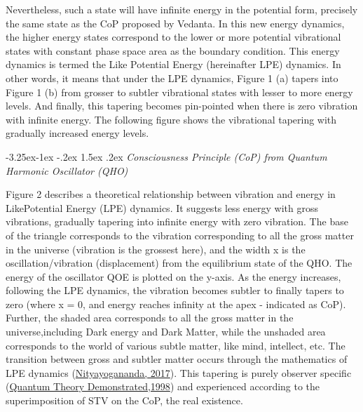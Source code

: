 \documentclass[twoside, 13pt]{article}
\makeatletter
\renewcommand\subsubsection{\@startsection{subsubsection}{3}{\z@}%
                                     {-3.25ex\@plus -1ex \@minus -.2ex}%
                                     {1.5ex \@plus .2ex}%
                                     {\normalfont\large\bfseries}}
\makeatother
\begin{document}
{{Nevertheless, such a state will have infinite energy in the potential form, precisely the same state as the CoP proposed by Vedanta. In this new energy dynamics, the higher energy states correspond to the lower or more potential vibrational states with constant phase space area as the boundary condition. This energy dynamics is termed the Like Potential Energy (hereinafter LPE) dynamics. In other words, it means that under the LPE dynamics, Figure 1 (a) tapers into Figure 1 (b) from grosser to subtler vibrational states with lesser to more energy levels. And finally, this tapering becomes pin-pointed when there is zero vibration with infinite energy. The following figure shows the vibrational tapering with gradually increased energy levels.}

{\fontsize{8}{10}\selectfont\subsubsection{\textit{Consciousness Principle (CoP) from Quantum Harmonic Oscillator (QHO)}}}\label{subsubsec-3.2.1}

{\fontsize{12}{14}\selectfont Figure 2 describes a theoretical relationship between vibration and energy in Like\break Potential Energy (LPE) dynamics. It suggests less energy with gross vibrations, gradually tapering into infinite energy with zero vibration. The base of the triangle corresponds to the vibration corresponding to all the gross matter in the universe (vibration is the grossest here), and the width x is the oscillation/vibration (displacement) from the equilibrium state of the QHO. The energy of the oscillator QOE is plotted on the y-axis. As the energy increases, following the LPE dynamics, the vibration becomes subtler to finally tapers to zero (where x = 0, and energy reaches infinity at the apex - indicated as CoP). Further, the shaded area corresponds to all the gross matter in the universe,\break including Dark energy and Dark Matter, while the unshaded area corresponds to the world of various subtle matter, like mind, intellect, etc. The transition between gross and subtler matter occurs through the mathematics of LPE dynamics (\underline{Nityayogananda, 2017}).  This tapering is purely observer specific (\underline{Quantum Theory Demonstrated,1998}) and experienced according to the superimposition of STV on the CoP, the real existence.}

}
\end{document}

